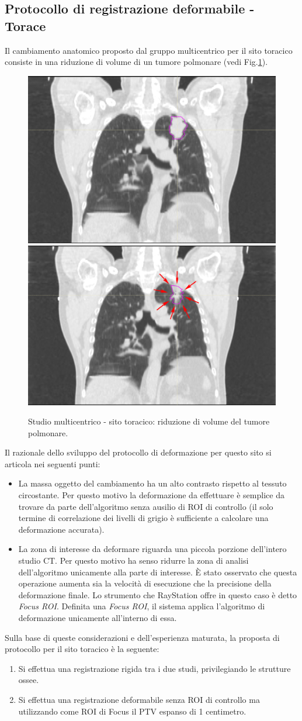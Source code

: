 \subsection{Protocollo di registrazione deformabile - Torace}
Il cambiamento anatomico proposto dal gruppo multicentrico per il sito toracico consiste in una riduzione di volume di un tumore polmonare (vedi Fig.\ref{fig:YES_thorax}). 
\begin{figure}
\centering
\includegraphics[width=.48\textwidth]{./cap3/YES_Thorax.png}
\includegraphics[width=.48\textwidth]{./cap3/YES_Thorax_shrink.png}
\caption{Studio multicentrico - sito toracico: riduzione di volume del tumore polmonare.}
\label{fig:YES_thorax}
\end{figure}
Il razionale dello sviluppo del protocollo di deformazione per questo sito si articola nei seguenti punti:
\begin{itemize}
\item La massa oggetto del cambiamento ha un alto contrasto rispetto al tessuto circostante. Per questo motivo la deformazione da effettuare è semplice da trovare da parte dell'algoritmo senza ausilio di ROI di controllo (il solo termine di correlazione dei livelli di grigio è sufficiente a calcolare una deformazione accurata).
\item La zona di interesse da deformare riguarda una piccola porzione dell'intero studio CT. Per questo motivo ha senso ridurre la zona di analisi dell'algoritmo unicamente alla parte di interesse. \`E stato osservato che questa operazione aumenta sia la velocità di esecuzione che la precisione della deformazione finale. Lo strumento che RayStation offre in questo caso è detto \textit{Focus ROI}. Definita una \textit{Focus ROI}, il sistema applica l'algoritmo di deformazione unicamente all'interno di essa. 
\end{itemize}
Sulla base di queste considerazioni e dell'esperienza maturata, la proposta di protocollo per il sito toracico è la seguente:
\begin{enumerate}
\item Si effettua una registrazione rigida tra i due studi, privilegiando le strutture ossee.
\item Si effettua una registrazione deformabile senza ROI di controllo ma utilizzando come ROI di Focus il PTV espanso di 1 centimetro.
\end{enumerate}


